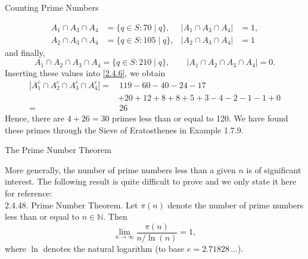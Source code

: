 \documentclass[smaller,hyperref={CJKbookmarks=true}]{beamer}
\newcommand{\N}{\mathbb{N}} \newcommand{\Z}{\mathbb{Z}} \newcommand{\Q}{\mathbb{Q}}
\newcounter{zhuo}[subsection]
\begin{document}
\begin{frame}{Counting Prime Numbers}
\begin{spacing}{0.8}
\begin{align*}
  A_1\cap A_3\cap A_4 &=\{q\in S:70\mid q\}, & |A_1\cap A_3\cap A_4| &=1,\\
  A_2\cap A_3\cap A_4 &=\{q\in S:105\mid q\}, & |A_2\cap A_3\cap A_4| &=1
\end{align*}
and finally,
\[A_1\cap A_2\cap A_3\cap A_4=\{q\in S:210\mid q\},\qquad |A_1\cap A_2\cap A_3\cap A_4|=0.\]
Inserting these values into \eqref{2.4.6}, we obtain
\begin{equation*}
  \begin{split}
     |A_1^c\cap A_2^c\cap A_3^c\cap A_4^c|= &\,119-60-40-24-17 \\
       &+20+12+8+8+5+3-4-2-1-1+0 \\
       =&\,26
  \end{split}
\end{equation*}
Hence, there are $4+26=30$ primes less than or equal to 120. We have found\\[3pt] these primes through the Sieve of Eratosthenes in Example 1.7.9.
\end{spacing}
\end{frame}
\begin{frame}[c]{The Prime Number Theorem}
\begin{spacing}{1.1}
More generally, the number of prime numbers less than a given $n$ is of
significant interest. The following result is quite difficult to prove and we
only state it here for reference:\\[6pt]
\alert{2.4.48. Prime Number Theorem.} Let $\pi(n)$ denote the number of prime numbers less than or equal to $n\in\N$. Then
\[\lim_{n\to\infty}\frac{\pi(n)}{n/\ln(n)}=1,\]
where $\ln$ denotes the natural logarithm (to base $e=2.71828\,...$).
\end{spacing}
\end{frame}
\end{document}

